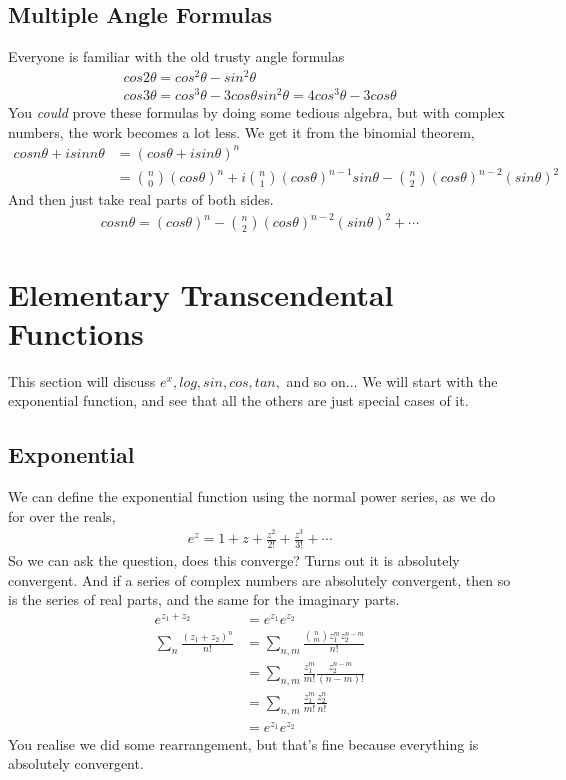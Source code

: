 \documentclass{article}
\begin{document}
\subsection{Multiple Angle Formulas}
Everyone is familiar with the old trusty angle formulas
\begin{gather*}
	cos2\theta = cos^2\theta - sin^2\theta \\
	cos3\theta = cos^3\theta - 3cos\theta sin^2\theta = 4cos^3\theta - 3cos\theta
\end{gather*}
You \textit{could} prove these formulas by doing some tedious algebra, but with complex numbers, the
work becomes a lot less. We get it from the binomial theorem,
\begin{align*}
	cosn\theta + isinn\theta & = (cos\theta + isin\theta)^n                                                                                       \\
	                         & = \binom{n}{0}(cos\theta)^n + i\binom{n}{1}(cos\theta)^{n-1}sin\theta - \binom{n}{2}(cos\theta)^{n-2}(sin\theta)^2
\end{align*}
And then just take real parts of both sides.
\begin{gather*}
	cosn\theta = (cos\theta)^n - \binom{n}{2} (cos\theta)^{n-2}(sin\theta)^2 + \cdots
\end{gather*}
\section{Elementary Transcendental Functions}
This section will discuss $e^x, log, sin, cos, tan,$ and so on... We will start with the exponential
function, and see that all the others are just special cases of it.
\subsection{Exponential}
We can define the exponential function using the normal power series, as we do for over the reals,
\begin{gather*}
	e^z = 1 + z + \frac{z^2}{2!} + \frac{z^3}{3!} + \cdots
\end{gather*}
So we can ask the question, does this converge? Turns out it is absolutely convergent. And if a series
of complex numbers are absolutely convergent, then so is the series of real parts, and the same for the
imaginary parts.
\begin{align*}
	e^{z_1+z_2}                                    & = e^{z_1}e^{z_2}                                                     \\
	\displaystyle\sum_{n}^{}\frac{(z_1+z_2)^n}{n!} & = \displaystyle\sum_{n,m}^{}\frac{\binom{n}{m}z_1^m z_2^{n-m}}{n!}   \\
	                                               & = \displaystyle\sum_{n,m}^{}\frac{z_1^m}{m!}\frac{z_2^{n-m}}{(n-m)!} \\
	                                               & = \displaystyle\sum_{n,m}^{}\frac{z_1^m}{m!}\frac{z_2^n}{n!}         \\
	                                               & = e^{z_1}e^{z_2}
\end{align*}
You realise we did some rearrangement, but that's fine because everything is absolutely
convergent.
\end{document}
